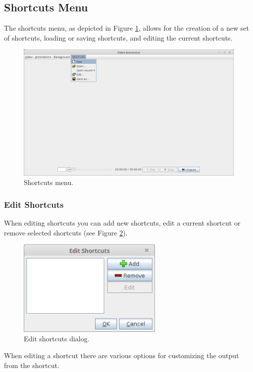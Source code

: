\documentclass[a4paper]{book}
\begin{document}
\subsection{Shortcuts Menu}
The shortcuts menu, as depicted in Figure \ref{AnnotatorShortcutsMenu}, allows
for the creation of a new set of shortcuts, loading or saving shortcuts, and
editing the current shortcuts.

\begin{figure}[htb]
  \centering
  \includegraphics[width=12.0cm]{images/AnnotatorShortcutsMenu.png}
  \caption{Shortcuts menu.}
  \label{AnnotatorShortcutsMenu}
\end{figure}

\subsubsection{Edit Shortcuts}
When editing shortcuts you can add new shortcuts, edit a current shortcut or
remove selected shortcuts (see Figure \ref{AnnotationEditShortcuts}).

\begin{figure}[htb]
  \centering
  \includegraphics[width=7.0cm]{images/AnnotatorEditShortcuts.png}
  \caption{Edit shortcuts dialog.}
  \label{AnnotationEditShortcuts}
\end{figure}

When editing a shortcut there are various options for customizing the output
from the shortcut.
\end{document}
